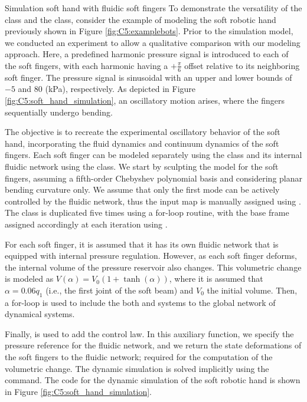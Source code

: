 \begin{example}{Simulation soft hand with fluidic soft fingers}
To demonstrate the versatility of the  class and the  class, consider the example of modeling the soft robotic hand previously shown in Figure \ref{fig:C5:examplebots}. Prior to the simulation model, we conducted an experiment to allow a qualitative comparison with our modeling approach. Here, a predefined harmonic pressure signal is introduced to each of the soft fingers, with each harmonic having a $+\frac{\pi}{6}$ offset relative to its neighboring soft finger. The pressure signal is sinusoidal with an upper and lower bounds of $-5$ and $80$ (kPa), respectively. As depicted in Figure \ref{fig:C5:soft_hand_simulation}, an oscillatory motion arises, where the fingers sequentially undergo bending.

The objective is to recreate the experimental oscillatory behavior of the soft hand, incorporating the fluid dynamics and continuum dynamics of the soft fingers. Each soft finger can be modeled separately using the  class and its internal fluidic network using the  class. We start by sculpting the model for the soft fingers, assuming a fifth-order Chebyshev polynomial basis and considering planar bending curvature only. We assume that only the first mode can be actively controlled by the fluidic network, thus the input map is manually assigned using . The  class is duplicated five times using a for-loop routine, with the base frame assigned accordingly at each iteration using .

For each soft finger, it is assumed that it has its own fluidic network that is equipped with internal pressure regulation. However, as each soft finger deforms, the internal volume of the pressure reservoir also changes. This volumetric change is modeled as $V(\alpha) = V_0 (1 + \tanh(\alpha))$, where it is assumed that $\alpha = 0.06 q_1$ (i.e., the first joint of the soft beam) and $V_0$ the initial volume. Then, a for-loop is used to include the both  and  systems to the global network of dynamical systems. 

Finally,  is used to add the control law. In this auxiliary function, we specify the pressure reference for the fluidic network, and we return the state deformations of the soft fingers to the fluidic network; required for the computation of the volumetric change. The dynamic simulation is solved implicitly using the  command. The code for the dynamic simulation of the soft robotic hand is shown in Figure \ref{fig:C5:soft_hand_simulation}.


\end{example}
